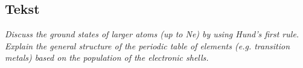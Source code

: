 \subsection{Tekst}

\emph{Discuss the ground states of larger atoms (up to Ne) by using Hund's first rule. Explain the general structure of the periodic table of elements (e.g. transition metals) based on the population of the electronic shells.}